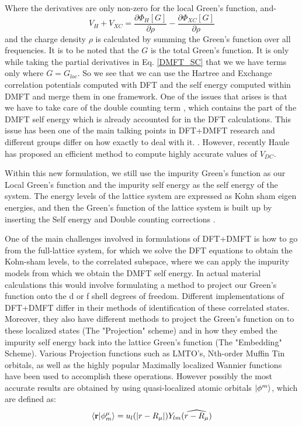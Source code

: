 \documentclass[10pt]{ruthesis}
\begin{document}
 Where the derivatives are only non-zero for the local Green's function, and-
 \begin{equation}
V_H+V_{XC}=\dfrac{\partial \Phi_{H}[G]}{\partial \rho}- \dfrac{\partial \Phi_{XC}[G]}{\partial \rho}
 \end{equation}
 and the charge density $\rho$ is calculated by summing the Green's function over all frequencies. It is to be noted that the $G$ is the total Green's function. It is only while taking the partial derivatives in Eq. \ref{DMFT_SC} that we we have terms only where $G=G_{loc}$. So we see that we can use the Hartree and Exchange correlation potentials computed with DFT and the self energy computed within DMFT and merge them in one framework. One of the issues that arises is that we have to take care of the double counting term , which contains the part of the DMFT self energy which is already accounted for in the DFT calculations. This issue has been one of the main talking points in DFT+DMFT research and different groups differ on how exactly to deal with it. \cite{Millis_DC}  \cite{Sawatsky_DC} . However, recently Haule \cite{Haule_DC} has proposed an efficient method to compute highly accurate values of $V_{DC} $.
 
 Within this new formulation, we still use the impurity Green's function as our Local Green's function and the impurity self energy as the self energy of the system. The energy levels of the lattice system are expressed as Kohn sham eigen energies, and then the Green's function of the lattice system is built up by inserting the Self energy and Double counting corrections . 
 
One of the main challenges involved in formulations of DFT+DMFT is how to go from the full-lattice system, for which we solve the DFT equations to obtain the Kohn-sham levels, to the correlated subspace, where we can apply the impurity models from which we obtain the DMFT self energy. In actual material calculations this would involve formulating a method to project our Green's function onto the d or f shell degrees of freedom. Different implementations of DFT+DMFT differ in their methods of identification of these correlated states. Moreover, they also have different methods to project the Green's function on to these localized states (The "Projection" scheme) and in how they embed the impurity self energy back into the lattice Green's function (The "Embedding" Scheme). Various Projection functions such as LMTO's, Nth-order Muffin Tin orbitals, as well as the highly popular Maximally localized Wannier functions have been used to accomplish these operations. However possibly the most accurate results are obtained by using quasi-localized atomic orbitals $|\phi^m \rangle$, which are defined as:
\begin{equation}\label{Projector}
\langle \mathbf{r} |\phi_m^\mu \rangle= u_l(|r-R_\mu|) Y_{lm}(\widehat{r-R_\mu})
\end{equation}
\end{document}
